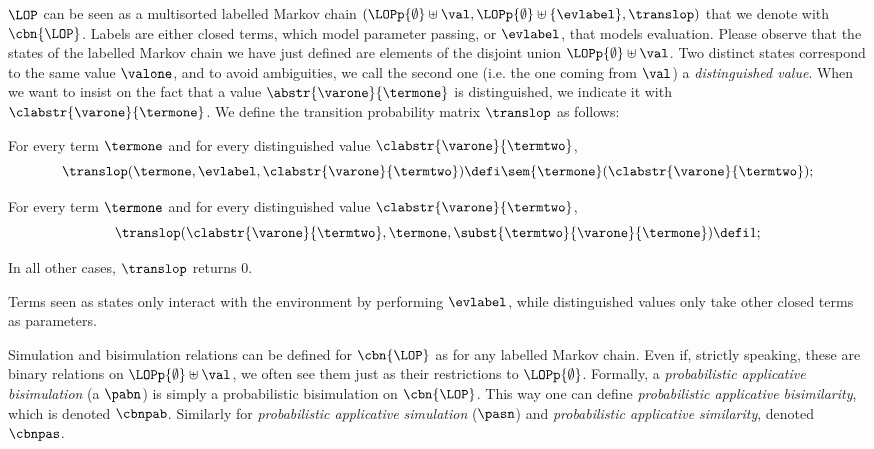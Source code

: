\begin{definition}
\label{d:multisort}
$\LOP$ can be seen as a multisorted labelled Markov chain
$(\LOPp{\emptyset}\uplus\val,\LOPp{\emptyset}\uplus\{\evlabel\},\translop)$
that we denote with $\cbn{\LOP}$. Labels are either closed terms, which model
parameter passing, or $\evlabel$, that models evaluation. 
Please observe that the states of the labelled Markov chain we have 
just defined are elements of the disjoint union $\LOPp{\emptyset}\uplus\val$. 
Two distinct states correspond to the
same value $\valone$, and to avoid ambiguities, we call the second one
(i.e. the one coming from $\val$) a \emph{distinguished value}.  When we
want to insist on the fact that a value $\abstr{\varone}{\termone}$ is
distinguished, we indicate it with $\clabstr{\varone}{\termone}$. We
define the transition probability matrix $\translop$ as follows:
\begin{varitemize}
\item 
  For every term $\termone$ and for every 
  distinguished value $\clabstr{\varone}{\termtwo}$,
  $$
  \translop(\termone, \evlabel,\clabstr{\varone}{\termtwo})\defi\sem{\termone}(\clabstr{\varone}{\termtwo});
  $$
\item 
  For every term $\termone$ and for every distinguished value $\clabstr{\varone}{\termtwo}$,
  $$
  \translop(\clabstr{\varone}{\termtwo}, \termone,
  \subst{\termtwo}{\varone}{\termone})\defi 1;
  $$
\item
  In all other cases, $\translop$ returns $0$.
\end{varitemize}
\end{definition}
Terms seen as states  only interact with the
environment by performing $\evlabel$, while distinguished values 
only take other closed terms as parameters. 

Simulation and bisimulation relations can be defined for $\cbn{\LOP}$ as for any 
labelled Markov chain. Even if, strictly speaking, these are binary relations on 
$\LOPp{\emptyset}\uplus\val$, we often see them just as their restrictions to 
$\LOPp{\emptyset}$. 
Formally, a \emph{probabilistic applicative bisimulation} (a
$\pabn$) is simply a probabilistic bisimulation on $\cbn{\LOP}$. This way one can 
define \emph{probabilistic applicative bisimilarity}, which is denoted $\cbnpab$.
Similarly for \emph{probabilistic applicative simulation} ($\pasn$) and \emph{probabilistic
applicative similarity}, denoted $\cbnpas$.

